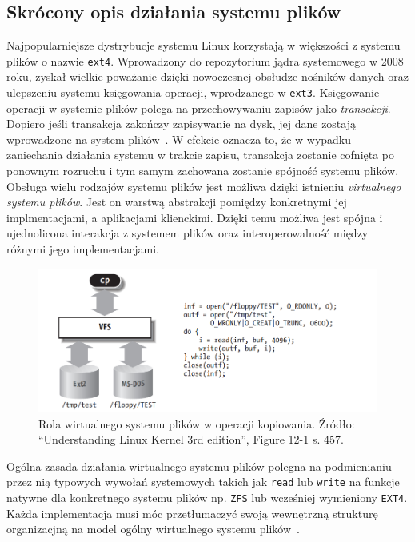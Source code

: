 \subsection{Skrócony opis działania systemu plików}
Najpopularniejsze dystrybucje systemu Linux korzystają w większości z systemu plików o nazwie \texttt{ext4}.
Wprowadzony do repozytorium jądra systemowego w 2008 roku, zyskał wielkie poważanie dzięki nowoczesnej obsłudze nośników 
danych oraz ulepszeniu systemu księgowania operacji, wprodzanego w \texttt{ext3}. Księgowanie operacji w systemie plików
polega na przechowywaniu zapisów jako \emph{transakcji}. Dopiero jeśli transakcja zakończy zapisywanie na dysk, jej dane 
zostają wprowadzone na system plików~\cite{ext4}. W efekcie oznacza to, że w wypadku zaniechania działania
systemu w trakcie zapisu, transakcja zostanie cofnięta po ponownym rozruchu i tym samym zachowana zostanie spójność systemu plików.
\newline
Obsługa wielu rodzajów systemu plików jest możliwa dzięki istnieniu \emph{virtualnego systemu plików}. 
Jest on warstwą abstrakcji pomiędzy konkretnymi jej implmentacjami, a aplikacjami klienckimi.
Dzięki temu możliwa jest spójna i ujednolicona interakcja z systemem plików oraz interoperowalność między różnymi jego implementacjami.~\cite{kernel}
\begin{figure}[H]
    \centering
    \includegraphics[width=0.9\linewidth]{rysunki/vfs.png}
    \caption{Rola wirtualnego systemu plików w operacji kopiowania.
    Źródło: \foreignquote{english}{Understanding Linux Kernel 3rd edition}, Figure 12-1 s. 457.} 
    \label{fig:enter-label}
\end{figure}
Ogólna zasada działania wirtualnego systemu plików polegna na podmienianiu przez nią typowych wywołań systemowych
takich jak \texttt{read} lub \texttt{write} na funkcje natywne dla konkretnego systemu plików np. \texttt{ZFS} lub wcześniej wymieniony \texttt{EXT4}.
Każda implementacja musi móc przetłumaczyć swoją wewnętrzną strukturę organizacjną na model ogólny wirtualnego systemu plików~\cite{kernel}.
